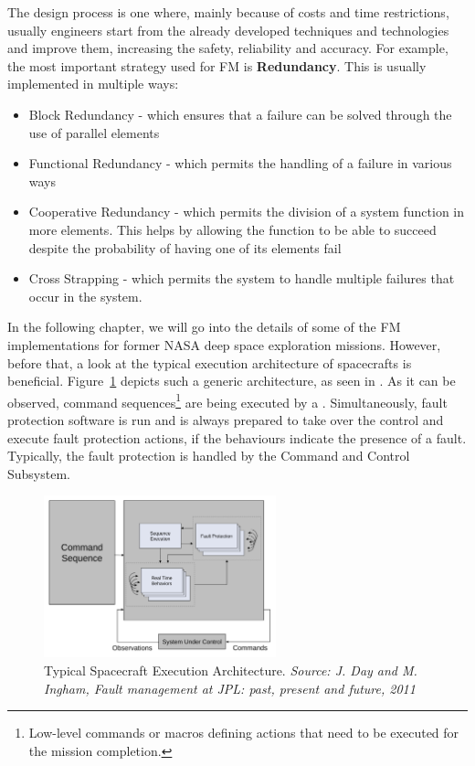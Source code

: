 The design process is one where, mainly because of costs and time restrictions,
usually engineers start from the already developed techniques and technologies
and improve them, increasing the safety, reliability and accuracy. For example,
the most important strategy used for FM is \textbf{Redundancy}. This is usually
implemented in multiple ways\cite{surv-nasa-mars}:
\begin{itemize}
\item Block Redundancy - which ensures that a failure can be solved through the
use of parallel elements
\item Functional Redundancy - which permits the handling of a failure in various
ways
\item Cooperative Redundancy - which permits the division of a system function
in more elements. This helps by allowing the function to be able to succeed despite
the probability of having one of its elements fail
\item Cross Strapping - which permits the system to handle multiple failures
that occur in the system.
\end{itemize}

In the following chapter, we will go into the details of some of the FM
implementations for former NASA deep space exploration missions. However, before
that, a look at the typical execution architecture of spacecrafts is beneficial.
Figure~\ref{fig:spacecraft_execution_architecture} depicts such a generic
architecture, as seen in \cite{fm-jpl}. As it can be observed, command
sequences\footnote{Low-level commands or macros defining actions that need to be
executed for the mission completion.} are being executed by a . Simultaneously, fault protection software is run and is
always prepared to take over the control and execute fault protection actions,
if the behaviours indicate the presence of a fault. Typically, the fault
protection is handled by the Command and Control Subsystem.

\begin{figure}[htb]
	\begin{center}
	\includegraphics[width=0.6\textwidth]{img/spacecraft_execution_architecture.pdf}
	\caption{Typical Spacecraft Execution Architecture. \small{\textit{Source: J.
	Day and M. Ingham, Fault management at JPL: past, present and future, 2011}}}
	\label{fig:spacecraft_execution_architecture}
	\end{center}
\end{figure}

